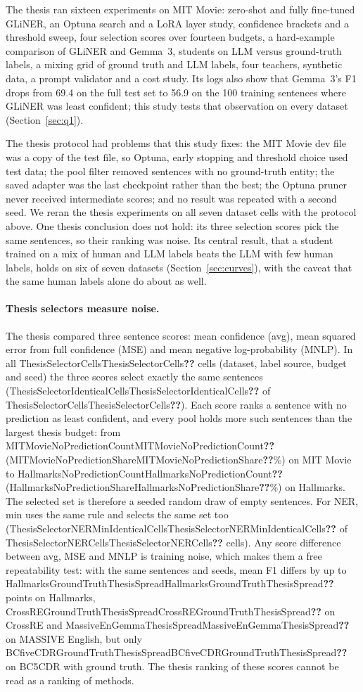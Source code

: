 \documentclass[11pt]{article}
\newcommand{\res}[1]{\ifcsname #1\endcsname\csname #1\endcsname\else\textbf{??}\fi}
\begin{document}
The thesis ran sixteen experiments on MIT Movie: zero-shot and fully fine-tuned GLiNER, an Optuna search and a LoRA layer study, confidence brackets and a threshold sweep, four selection scores over fourteen budgets, a hard-example comparison of GLiNER and Gemma~3, students on LLM versus ground-truth labels, a mixing grid of ground truth and LLM labels, four teachers, synthetic data, a prompt validator and a cost study. Its logs also show that Gemma~3's F1 drops from 69.4 on the full test set to 56.9 on the 100 training sentences where GLiNER was least confident; this study tests that observation on every dataset (Section~\ref{sec:q1}).

The thesis protocol had problems that this study fixes: the MIT Movie dev file was a copy of the test file, so Optuna, early stopping and threshold choice used test data; the pool filter removed sentences with no ground-truth entity; the saved adapter was the last checkpoint rather than the best; the Optuna pruner never received intermediate scores; and no result was repeated with a second seed. We reran the thesis experiments on all seven dataset cells with the protocol above. One thesis conclusion does not hold: its three selection scores pick the same sentences, so their ranking was noise. Its central result, that a student trained on a mix of human and LLM labels beats the LLM with few human labels, holds on six of seven datasets (Section~\ref{sec:curves}), with the caveat that the same human labels alone do about as well.

\paragraph{Thesis selectors measure noise.} The thesis compared three sentence scores: mean confidence (avg), mean squared error from full confidence (MSE) and mean negative log-probability (MNLP). In all \res{ThesisSelectorCells} cells (dataset, label source, budget and seed) the three scores select exactly the same sentences (\res{ThesisSelectorIdenticalCells} of \res{ThesisSelectorCells}). Each score ranks a sentence with no prediction as least confident, and every pool holds more such sentences than the largest thesis budget: from \res{MITMovieNoPredictionCount} (\res{MITMovieNoPredictionShare}\%) on MIT Movie to \res{HallmarksNoPredictionCount} (\res{HallmarksNoPredictionShare}\%) on Hallmarks. The selected set is therefore a seeded random draw of empty sentences. For NER, min uses the same rule and selects the same set too (\res{ThesisSelectorNERMinIdenticalCells} of \res{ThesisSelectorNERCells} cells). Any score difference between avg, MSE and MNLP is training noise, which makes them a free repeatability test: with the same sentences and seeds, mean F1 differs by up to \res{HallmarksGroundTruthThesisSpread} points on Hallmarks, \res{CrossREGroundTruthThesisSpread} on CrossRE and \res{MassiveEnGemmaThesisSpread} on MASSIVE English, but only \res{BCfiveCDRGroundTruthThesisSpread} on BC5CDR with ground truth. The thesis ranking of these scores cannot be read as a ranking of methods.
\end{document}
